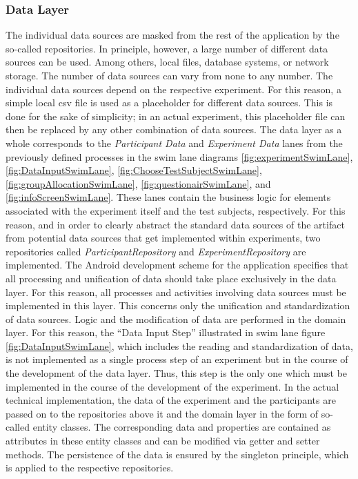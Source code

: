 \subsubsection{Data Layer}

The individual data sources are masked from the rest of the application by the so-called repositories. In principle, however, a large number of different data sources can be used. Among others, local files, database systems, or network storage. The number of data sources can vary from none to any number. The individual data sources depend on the respective experiment. For this reason, a simple local \ac{csv} file is used as a placeholder for different data sources. This is done for the sake of simplicity; in an actual experiment, this placeholder file can then be replaced by any other combination of data sources. The data layer as a whole corresponds to the \textit{Participant Data} and \textit{Experiment Data} lanes from the previously defined processes in the swim lane diagrams \ref{fig:experimentSwimLane}, \ref{fig:DataInputSwimLane}, \ref{fig:ChooseTestSubjectSwimLane}, \ref{fig:groupAllocationSwimLane}, \ref{fig:questionairSwimLane}, and \ref{fig:infoScreenSwimLane}. These lanes contain the business logic for elements associated with the experiment itself and the test subjects, respectively. For this reason, and in order to clearly abstract the standard data sources of the artifact from potential data sources that get implemented within experiments, two repositories called \textit{ParticipantRepository} and \textit{ExperimentRepository} are implemented. The Android development scheme for the application specifies that all processing and unification of data should take place exclusively in the data layer. For this reason, all processes and activities involving data sources must be implemented in this layer. This concerns only the unification and standardization of data sources. Logic and the modification of data are performed in the domain layer. For this reason, the \enquote{Data Input Step} illustrated in swim lane figure \ref{fig:DataInputSwimLane}, which includes the reading and standardization of data, is not implemented as a single process step of an experiment but in the course of the development of the data layer. Thus, this step is the only one which must be implemented in the course of the development of the experiment. In the actual technical implementation, the data of the experiment and the participants are passed on to the repositories above it and the domain layer in the form of so-called entity classes. The corresponding data and properties are contained as attributes in these entity classes and can be modified via getter and setter methods. The persistence of the data is ensured by the singleton principle, which is applied to the respective repositories.


